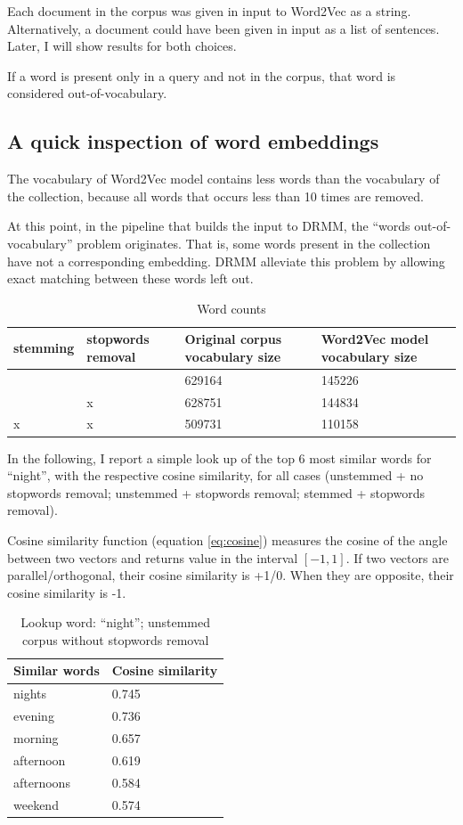 Each document in the corpus was given in input to Word2Vec as a string. Alternatively, a document could have been given in input as a list of sentences. Later, I will show results for both choices.

If a word is present only in a query and not in the corpus, that word is considered out-of-vocabulary.

\subsection{A quick inspection of word embeddings}

The vocabulary of Word2Vec model contains less words than the vocabulary of the collection, because all words that occurs less than 10 times are removed.

At this point, in the pipeline that builds the input to DRMM, the ``words out-of-vocabulary'' problem originates. That is, some words present in the collection have not a corresponding embedding. DRMM alleviate this problem by allowing exact matching between these words left out.

\begin{table}[H]
\centering
\begin{tabular}{p{2cm}p{2cm}p{4cm}p{4cm}}
\textbf{stemming} & \textbf{stopwords removal} & \textbf{Original corpus vocabulary size} & \textbf{Word2Vec model vocabulary size} \\ \hline
& & 629164 & 145226 \\
& x & 628751 & 144834 \\
x & x & 509731 & 110158 \\
\end{tabular}
\caption{Word counts}
\end{table}

In the following, I report a simple look up of the top 6 most similar words for ``night'', with the respective cosine similarity, for all cases (unstemmed + no stopwords removal; unstemmed + stopwords removal; stemmed + stopwords removal).

Cosine similarity function (equation \ref{eq:cosine}) measures the cosine of the angle between two vectors and returns value in the interval $[-1, 1]$. If two vectors are parallel/orthogonal, their cosine similarity is +1/0. When they are opposite, their cosine similarity is -1.

\begin{table}[H]
\centering
\begin{tabular}{ll}
\textbf{Similar words} & \textbf{Cosine similarity} \\ \hline  
nights & 0.745 \\
evening & 0.736\\
morning & 0.657 \\
afternoon & 0.619 \\
afternoons & 0.584 \\
weekend & 0.574 \\
\end{tabular}
\caption{Lookup word: ``night''; unstemmed corpus without stopwords removal}
\end{table}

